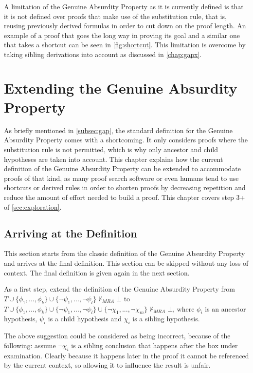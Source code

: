 \documentclass[11pt,twoside,a4paper]{report}
\begin{document}
A limitation of the Genuine Absurdity Property as it is currently defined is that it is not defined over proofs that make use of the substitution rule, that is, reusing previously derived formulas in order to cut down on the proof length. An example of a proof that goes the long way in proving its goal and a similar one that takes a shortcut can be seen in \autoref{fig:shortcut}. This limitation is overcome by taking sibling derivations into account as discussed in \autoref{chap:gapx}.

\chapter{Extending the Genuine Absurdity Property}
\label{chap:gapx}
As briefly mentioned in \autoref{subsec:gap}, the standard definition for the Genuine Absurdity Property comes with a shortcoming. It only considers proofs where the substitution rule is not permitted, which is why only ancestor and child hypotheses are taken into account. This chapter explains how the current definition of the Genuine Absurdity Property can be extended to accommodate proofs of that kind, as many proof search software or even humans tend to use shortcuts or derived rules in order to shorten proofs by decreasing repetition and reduce the amount of effort needed to build a proof. This chapter covers step 3+ of \autoref{sec:exploration}.

\section{Arriving at the Definition}
This section starts from the classic definition of the Genuine Absurdity Property and arrives at the final definition. This section can be skipped without any loss of context. The final definition is given again in the next section.

As a first step, extend the definition of the Genuine Absurdity Property from $T\cup\{\phi_1, ..., \phi_k\}\cup\{\neg\psi_1, ..., \neg\psi_l\}\nvdash_{MRA}\bot$ to $T\cup\{\phi_1, ..., \phi_k\}\cup\{\neg\psi_1, ..., \neg\psi_l\}\cup\{\neg\chi_1, ..., \neg\chi_m\}\nvdash_{MRA}\bot$, where $\phi_i$ is an ancestor hypothesis, $\psi_i$ is a child hypothesis and $\chi_i$ is a sibling hypothesis.

The above suggestion could be considered as being incorrect, because of the following: assume $\neg\chi_i$ is a sibling conclusion that happens after the box under examination. Clearly because it happens later in the proof it cannot be referenced by the current context, so allowing it to influence the result is unfair.
\end{document}
